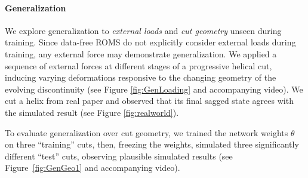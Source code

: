 
    

\paragraph{Generalization}
We explore generalization to 
\emph{external loads} and \emph{cut geometry} unseen during training.
Since data-free ROMS do not explicitly consider external loads during training, any external force may demonstrate generalization. We applied a sequence of external forces at different stages of a progressive helical cut, inducing varying deformations responsive to the changing geometry of the evolving discontinuity (see Figure \ref{fig:GenLoading} and accompanying video). We cut a helix from real paper and observed that its final sagged state agrees with the simulated result (see Figure \ref{fig:realworld}). 

To evaluate generalization over cut geometry, we trained the network weights $\theta$ on three ``training'' cuts, then, freezing the weights, simulated three significantly different ``test'' cuts, observing plausible simulated results (see Figure~\ref{fig:GenGeo1} and accompanying video).

